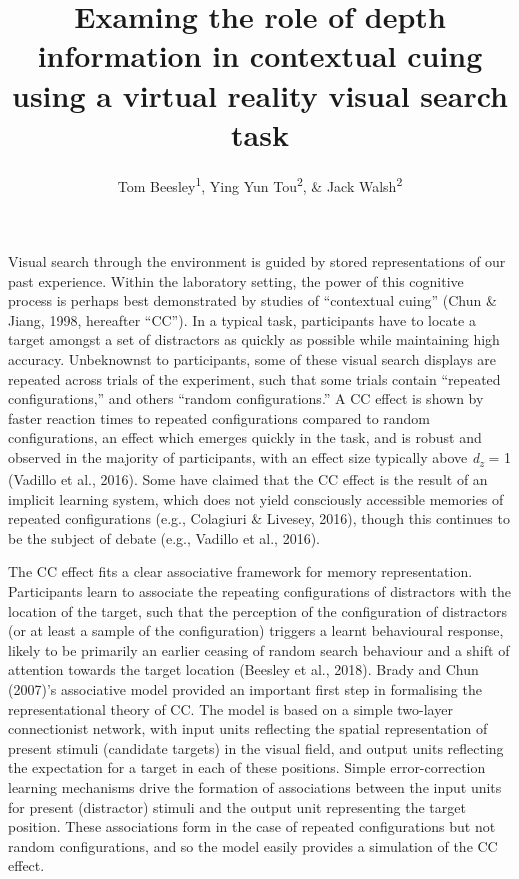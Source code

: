 \documentclass[
  english,
  man,floatsintext]{apa7}
\title{Examing the role of depth information in contextual cuing using a virtual reality visual search task}
\author{Tom Beesley\textsuperscript{1}, Ying Yun Tou\textsuperscript{2}, \& Jack Walsh\textsuperscript{2}}
\date{}
\affiliation{\vspace{0.5cm}\textsuperscript{1} Lancaster University, UK\\\textsuperscript{2} UNSW Sydney, Australia}
\begin{document}
\maketitle

Visual search through the environment is guided by stored representations of our past experience. Within the laboratory setting, the power of this cognitive process is perhaps best demonstrated by studies of ``contextual cuing'' (Chun \& Jiang, 1998, hereafter {``CC''}). In a typical task, participants have to locate a target amongst a set of distractors as quickly as possible while maintaining high accuracy. Unbeknownst to participants, some of these visual search displays are repeated across trials of the experiment, such that some trials contain ``repeated configurations,'' and others ``random configurations.'' A CC effect is shown by faster reaction times to repeated configurations compared to random configurations, an effect which emerges quickly in the task, and is robust and observed in the majority of participants, with an effect size typically above \emph{d\textsubscript{z}} = 1 (Vadillo et al., 2016). Some have claimed that the CC effect is the result of an implicit learning system, which does not yield consciously accessible memories of repeated configurations (e.g., Colagiuri \& Livesey, 2016), though this continues to be the subject of debate (e.g., Vadillo et al., 2016).

The CC effect fits a clear associative framework for memory representation. Participants learn to associate the repeating configurations of distractors with the location of the target, such that the perception of the configuration of distractors (or at least a sample of the configuration) triggers a learnt behavioural response, likely to be primarily an earlier ceasing of random search behaviour and a shift of attention towards the target location (Beesley et al., 2018). Brady and Chun (2007)'s associative model provided an important first step in formalising the representational theory of CC. The model is based on a simple two-layer connectionist network, with input units reflecting the spatial representation of present stimuli (candidate targets) in the visual field, and output units reflecting the expectation for a target in each of these positions. Simple error-correction learning mechanisms drive the formation of associations between the input units for present (distractor) stimuli and the output unit representing the target position. These associations form in the case of repeated configurations but not random configurations, and so the model easily provides a simulation of the CC effect.
\end{document}
